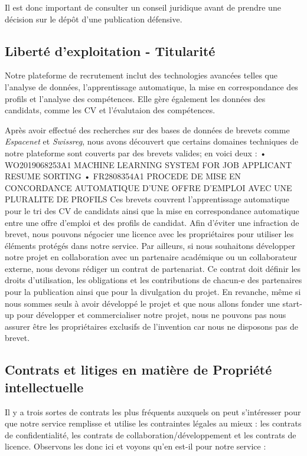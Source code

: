 Il est donc important de consulter un conseil juridique avant de prendre une décision sur le dépôt d'une publication défensive.

\subsection{Liberté d'exploitation - Titularité}

Notre plateforme de recrutement inclut des technologies avancées telles que l’analyse de données, l’apprentissage automatique,  la mise en correspondance des profils et l’analyse des compétences. Elle gère également les données des candidats, comme les CV et l’évalutaion des compétences.\newline 

Après avoir effectué des recherches sur des bases de données de brevets comme \textit{Espacenet} et \textit{Swissreg}, nous avons découvert que certains domaines techniques de notre plateforme sont couverts par des brevets valides; en voici deux : 
•   WO2019068253A1 MACHINE LEARNING SYSTEM FOR JOB APPLICANT RESUME SORTING
•   FR2808354A1 PROCEDE DE MISE EN CONCORDANCE AUTOMATIQUE D'UNE OFFRE D'EMPLOI AVEC UNE PLURALITE DE PROFILS
Ces brevets couvrent l'apprentissage automatique pour le tri des CV de candidats ainsi que la mise en correspondance automatique entre une offre d'emploi et des profils de candidat.
Afin d’éviter une infraction de brevet, nous pouvons négocier une licence avec les propriétaires pour utiliser les éléments protégés dans notre service. 
Par ailleurs, si nous souhaitons développer notre projet en collaboration avec un partenaire académique ou un collaborateur externe, nous devons rédiger un contrat de partenariat. Ce contrat doit définir les droits d’utilisation, les obligations et les contributions de chacun-e des partenaires pour la publication ainsi que pour la divulgation du projet. 
En revanche, même si nous sommes seuls à avoir développé le projet et que nous allons fonder une start-up pour développer et commercialiser notre projet,  nous ne pouvons pas nous assurer être les propriétaires exclusifs de l'invention car nous ne disposons pas de brevet. 

\subsection{Contrats et litiges en matière de Propriété intellectuelle}

Il y a trois sortes de contrats les plus fréquents auxquels on peut s'intéresser pour que notre service remplisse et utilise les contraintes légales au mieux : les contrats de confidentialité, les contrats de collaboration/développement et les contrats de licence. Observons les donc ici et voyons qu'en est-il pour notre service : 


